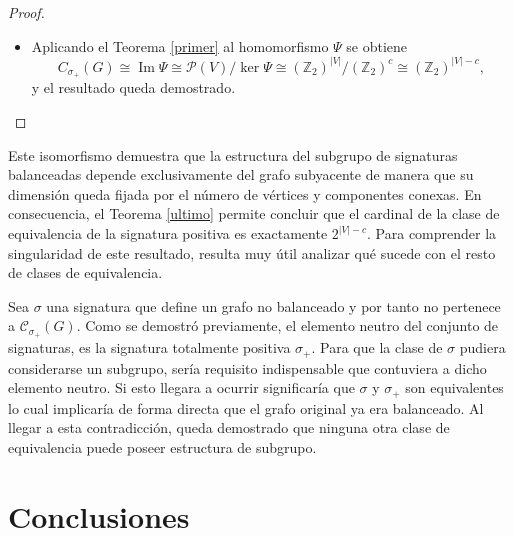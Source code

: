 \documentclass[11pt,a4paper,spanish]{report}
\theoremstyle{plain}
\begin{document}
\begin{proof}
\begin{itemize}
\begin{itemize}
Esta condición se cumple exactamente cuando \(X\) es unión de componentes conexas
de \(G\). En efecto, si \(X\) contiene componentes conexas completas, ninguna arista
posee un nodo en \(X\) y otro en $V / X$, y recíprocamente, si no hay aristas entre
\(X\) y su complemento, entonces \(X\) debe ser unión de componentes conexas.

En particular, si \(G\) es conexo, las únicas posibilidades son \(X=\varnothing\) o
\(X=V\), y por tanto
\[
\ker \Psi \cong \mathbb{Z}_2.
\]

En general, si \(G\) tiene \(c\) componentes conexas, cada una de ellas puede estar
o no contenida en \(X\) de forma independiente. Por tanto, 
\[
\ker \Psi \cong (\mathbb{Z}_2)^c.
\]

\end{itemize}
\item Aplicando el Teorema \ref{primer}  al homomorfismo \(\Psi\) se obtiene
\[
 C_{\sigma_+}(G)\cong \operatorname{Im}\Psi\cong \mathcal{P}(V)/\ker\Psi \cong (\mathbb{Z}_2)^{|V|}/(\mathbb{Z}_2)^{c}\cong(\mathbb{Z}_2)^{|V|-c},
\]
y el resultado queda demostrado.
\end{itemize}
\end{proof}
Este isomorfismo demuestra que la estructura del subgrupo de signaturas balanceadas depende exclusivamente del grafo subyacente de manera que su dimensión queda fijada por el número de vértices y componentes conexas. En consecuencia, el Teorema \ref{ultimo} permite concluir que el cardinal de la clase de equivalencia de la signatura positiva es exactamente $2^{|V|-c}$. Para comprender la singularidad de este resultado, resulta muy útil analizar qué sucede con el resto de clases de equivalencia. 

Sea $\sigma$ una signatura que define un grafo no balanceado y por tanto no pertenece a $\mathcal{C}_{\sigma_+}(G)$. Como se demostró previamente, el elemento neutro del conjunto de signaturas, es la signatura totalmente positiva $\sigma_+$. Para que la clase de $\sigma$ pudiera considerarse un subgrupo, sería requisito indispensable que contuviera a dicho elemento neutro. Si esto llegara a ocurrir significaría que $\sigma$ y $\sigma_+$ son equivalentes lo cual implicaría de forma directa que el grafo original ya era balanceado. Al llegar a esta contradicción, queda demostrado que ninguna otra clase de equivalencia puede poseer estructura de subgrupo.


\chapter{Conclusiones}\label{C7}
\end{document}
